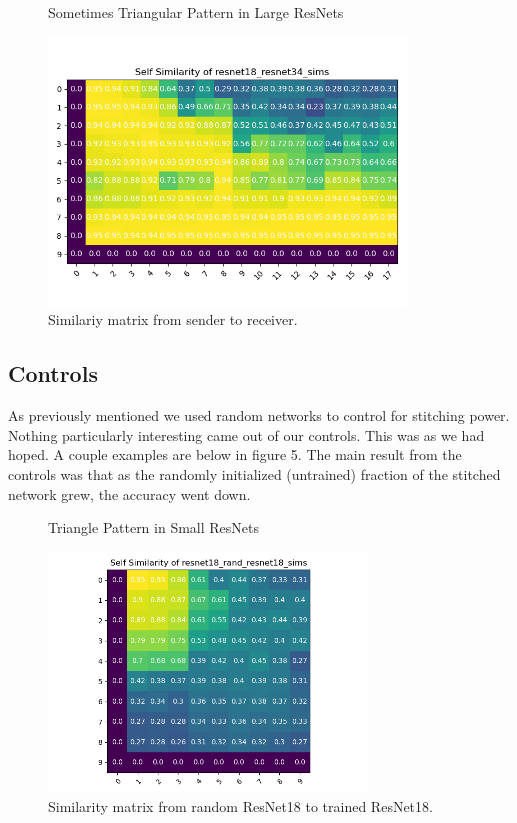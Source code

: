 \documentclass{article} %
\begin{document}
\label{Figure4}
\begin{center}
   \begin{figure}[h!]
      \centering
      \caption{Sometimes Triangular Pattern in Large ResNets}
      \includegraphics[width=9.5cm]{resnet18_resnet34_sims.png}
      \caption*{Similariy matrix from sender to receiver.}
   \end{figure}
\end{center}

\subsection*{Controls}
As previously mentioned we used random networks to control for stitching power. Nothing particularly interesting
came out of our controls. This was as we had hoped. A couple examples are below in figure 5. The main result from the controls
was that as the randomly initialized (untrained) fraction of the stitched network grew, the accuracy went down.

\label{Figure5}
\begin{center}
   \begin{figure}[h!]
      \centering
      \caption{Triangle Pattern in Small ResNets}
      \includegraphics[width=8.5cm]{resnet18_rand_resnet18_sims.png}
      \caption*{Similarity matrix from random ResNet18 to trained ResNet18.}
   \end{figure}
\end{center}
\end{document}
